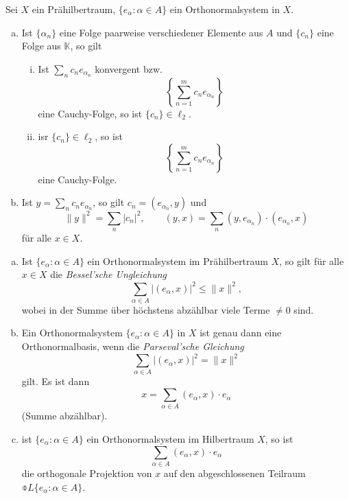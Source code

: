 \begin{thm} %
  Sei $X$ ein Prähilbertraum\footnotemark, $\{ e_{\alpha} : \alpha \in A \}$ ein
  Orthonormalsystem in $X$.
  \begin{enumerate}[a)]
  \item Ist $\{ \alpha_n \}$ eine Folge paarweise verschiedener Elemente aus $A$
    und $\{c_n\}$ eine Folge aus $\mathbb{K}$, so gilt
    \begin{enumerate}[(i)]
    \item Ist $\sum_n c_n e_{\alpha_n}$ konvergent bzw.
      \[ \left\{ \sum_{n=1}^m c_n e_{\alpha_n} \right\} \]
      eine Cauchy-Folge, so ist $\{ c_n \} \in \ell_2$.
    \item isr $\{c_n\} \in \ell_2$, so ist
      \[ \left\{ \sum_{n=1}^m c_n e_{\alpha_n} \right\} \]
      eine Cauchy-Folge.
    \end{enumerate}
  \item Ist $y = \sum_n c_n e_{\alpha_n}$, so gilt $c_n = (e_{\alpha_n}, y)$ und
    \[ \| y \|^2 = \sum_n |c_n|^2, \qquad
      (y,x) = \sum_n (y, e_{\alpha_n}) \cdot (e_{\alpha_n}, x)\]
    für alle $x \in X$.
  \end{enumerate}
\end{thm}

\begin{thm}[Entwicklungspunktsatz] %
  \begin{enumerate}[a)]
  \item Ist $\{ e_\alpha : \alpha \in A\}$ ein Orthonormalsystem im
    Prähilbertraum $X$, so gilt für alle $x \in X$ die \emph{Bessel'sche
      Ungleichung}
    \[ \sum_{\alpha \in A} |(e_{\alpha},x)|^2 \le \| x \|^2, \]
    wobei in der Summe über höchstens abzählbar viele Terme $\ne 0$ sind.
  \item Ein Orthonormalsystem $\{ e_\alpha : \alpha \in A \}$ in $X$ ist genau
    dann eine Orthonormalbasis, wenn die \emph{Parseval'sche Gleichung}
    \[ \sum_{\alpha \in A} |(e_\alpha,x)|^2 = \| x \|^2 \]
    gilt. Es ist dann
    \[ x = \sum_{\alpha \in A} (e_\alpha, x) \cdot e_\alpha \]
    (Summe abzählbar).
  \item ist $\{ e_\alpha : \alpha \in A \}$ ein Orthonormalsystem im Hilbertraum
    $X$, so ist
    \[ \sum_{\alpha \in A} (e_\alpha, x) \cdot e_\alpha \]
    die orthogonale Projektion von $x$ auf den abgeschlossenen Teilraum
    $\obar{L \{ e_\alpha : \alpha \in A\}}$.
  \end{enumerate}
\end{thm}

